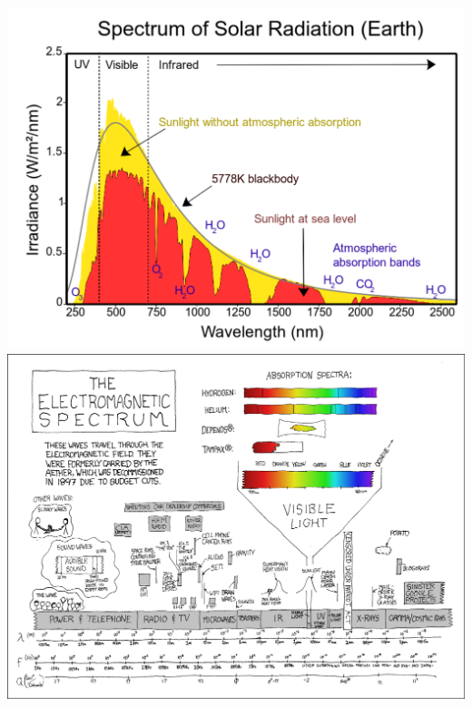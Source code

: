 \documentclass[12pt,a4paper]{article}
\renewcommand{\=}[1]{\stackrel{#1}{=}}
\theoremstyle{definition}
\theoremstyle{remark}
\begin{document}
\includegraphics[width=\linewidth]{pic/p27.pdf}
\includegraphics[height=\linewidth, angle=90]{pic/emxkcd.png}
\end{document}
